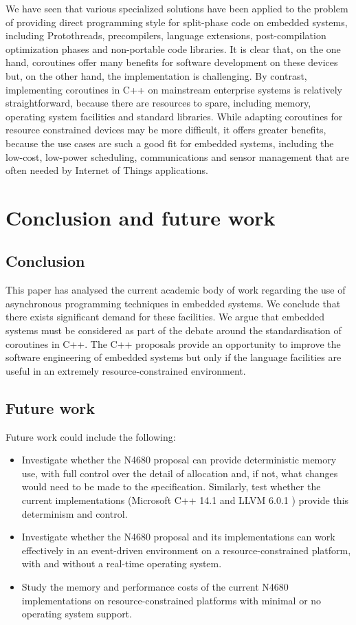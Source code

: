 \documentclass[format=acmsmall, review=false, screen=false]{acmart}
\begin{document}
We have seen that various specialized solutions have been applied to the problem of providing direct programming style for split-phase code on embedded systems, including Protothreads, precompilers, language extensions, post-compilation optimization phases and non-portable code libraries. It is clear that, on the one hand, coroutines offer many benefits for software development on these devices but, on the other hand, the implementation is challenging. By contrast, implementing coroutines in C++ on mainstream enterprise systems is relatively straightforward, because there are resources to spare, including memory, operating system facilities and standard libraries. While adapting coroutines for resource constrained devices may be more difficult, it offers greater benefits, because the use cases are such a good fit for embedded systems, including the low-cost, low-power scheduling, communications and sensor management that are often needed by Internet of Things applications.

\section{Conclusion and future work}
\label{section:conclusion}

\subsection{Conclusion}

This paper has analysed the current academic body of work regarding the use of asynchronous programming techniques in embedded systems. We conclude that there exists significant demand for these facilities. We argue that embedded systems must be considered as part of the debate around the standardisation of coroutines in C++. The C++ proposals provide an opportunity to improve the software engineering of embedded systems but only if the language facilities are useful in an extremely resource-constrained environment.

\subsection{Future work}

Future work could include the following:
\begin{itemize}
	\item Investigate whether the N4680 proposal can provide deterministic memory use, with full control over the detail of allocation and, if not, what changes would need to be made to the specification. Similarly, test whether the current implementations (Microsoft C++ 14.1 \cite{Microsoft2018} and LLVM 6.0.1 \cite{LLVMProject2018}) provide this determinism and control.
	\item Investigate whether the N4680 proposal and its implementations can work effectively in an event-driven environment on a resource-constrained platform, with and without a real-time operating system.
	\item Study the memory and performance costs of the current N4680 implementations on resource-constrained platforms with minimal or no operating system support.
\end{itemize}
\end{document}
